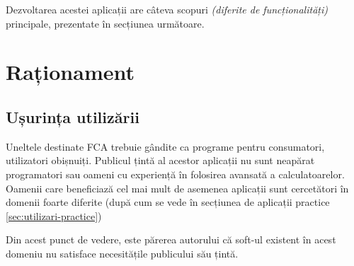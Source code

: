 \documentclass[12pt, a4paper, twoside, romanian]{teza-upb}
\begin{document}
  Dezvoltarea acestei aplicații are câteva scopuri \textit{(diferite de funcționalități)} principale, prezentate în secțiunea următoare.

  \section{Raționament}
  \label{sec:rationament}

    \subsection{Ușurința utilizării}
    \label{subsec:usurinta-de-utilizare}
      Uneltele destinate FCA trebuie gândite ca programe pentru consumatori, utilizatori obișnuiți. Publicul țintă al acestor aplicații nu sunt neapărat programatori sau oameni cu experiență în folosirea avansată a calculatoarelor. Oamenii care beneficiază cel mai mult de asemenea aplicații sunt cercetători în domenii foarte diferite (după cum se vede în secțiunea de aplicații practice \ref{sec:utilizari-practice})

      Din acest punct de vedere, este părerea autorului că soft-ul existent în acest domeniu nu satisface necesitățile publicului său țintă. 
\end{document}
